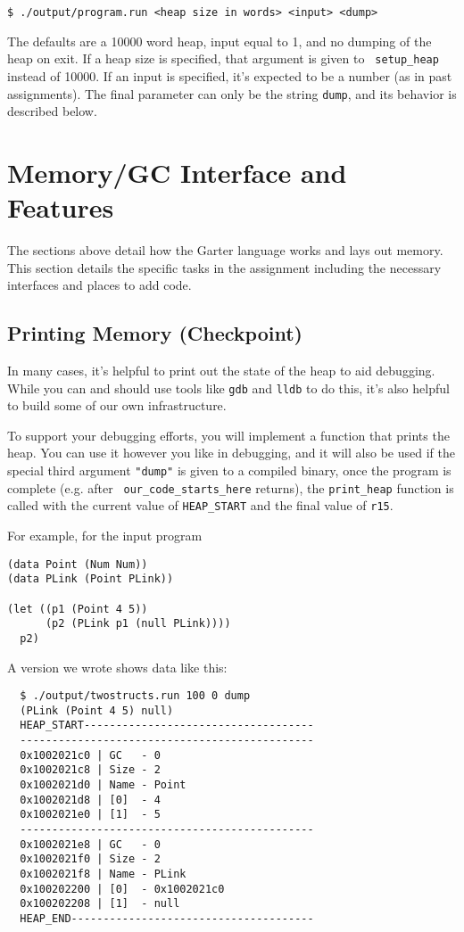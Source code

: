 \documentclass[10pt, oneside]{article}
\begin{document}
\begin{verbatim}
$ ./output/program.run <heap size in words> <input> <dump>
\end{verbatim}

The defaults are a 10000 word heap, input equal to 1, and no dumping of the
heap on exit. If a heap size is specified, that argument is given to {\tt
setup\_heap} instead of 10000. If an input is specified, it's expected to be
a number (as in past assignments). The final parameter can only be the string
{\tt dump}, and its behavior is described below.

\section*{Memory/GC Interface and Features}

The sections above detail how the Garter language works and lays out memory.
This section details the specific tasks in the assignment including the
necessary interfaces and places to add code.

\subsection*{Printing Memory (Checkpoint)}

In many cases, it's helpful to print out the state of the heap to aid
debugging. While you can and should use tools like {\tt gdb} and {\tt lldb}
to do this, it's also helpful to build some of our own infrastructure.

To support your debugging efforts, you will implement a function that prints
the heap. You can use it however you like in debugging, and it will also be
used if the special third argument {\tt "dump"} is given to a compiled
binary, once the program is complete (e.g. after {\tt
our\_code\_starts\_here} returns), the {\tt print\_heap} function is called
with the current value of {\tt HEAP\_START} and the final value of {\tt r15}.

For example, for the input program
\begin{verbatim}
(data Point (Num Num))
(data PLink (Point PLink))

(let ((p1 (Point 4 5))
      (p2 (PLink p1 (null PLink))))
  p2)
\end{verbatim}

A version we wrote shows data like this:

\begin{verbatim}
  $ ./output/twostructs.run 100 0 dump
  (PLink (Point 4 5) null)
  HEAP_START------------------------------------
  ----------------------------------------------
  0x1002021c0 | GC   - 0
  0x1002021c8 | Size - 2
  0x1002021d0 | Name - Point
  0x1002021d8 | [0]  - 4
  0x1002021e0 | [1]  - 5
  ----------------------------------------------
  0x1002021e8 | GC   - 0
  0x1002021f0 | Size - 2
  0x1002021f8 | Name - PLink
  0x100202200 | [0]  - 0x1002021c0
  0x100202208 | [1]  - null
  HEAP_END--------------------------------------
\end{verbatim}
\end{document}
